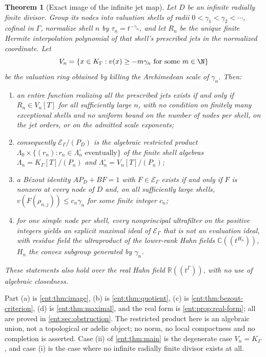 \documentclass[11pt]{article}
\newtheorem{theorem}{Theorem}[section]
\theoremstyle{plain}
\theoremstyle{plain}
\theoremstyle{plain}
\theoremstyle{definition}
\theoremstyle{definition}
\theoremstyle{definition}
\theoremstyle{definition}
\theoremstyle{remark}
\newcommand{\C}{\mathbb C}\newcommand{\R}{\mathbb R}
\newcommand{\K}{K_\Gamma}\newcommand{\KD}{K_\Delta}
\newcommand{\E}{\mathcal E_\Gamma}
\begin{document}
\begin{theorem}[Exact image of the infinite jet map]\label{ent:thm:main-image}
Let $D$ be an infinite radially finite divisor. Group its nodes into
valuation shells of radii $0<\gamma_1<\gamma_2<\cdots$, cofinal in $\Gamma$,
normalize shell $n$ by $\tau_n=t^{-\gamma_n}$, and let $R_n$ be the unique
finite Hermite interpolation polynomial of that shell's prescribed jets in
the normalized coordinate. Let
\[
 V_n=\{x\in\K:v(x)\ge-m\gamma_n\text{ for some }m\in\N\}
\]
be the valuation ring obtained by killing the Archimedean scale of
$\gamma_n$. Then:
\begin{enumerate}[label=\textnormal{(\alph*)},leftmargin=2em]
\item an entire function realizing all the prescribed jets exists if and only
if $R_n\in V_n[T]$ for all sufficiently large $n$, with no condition on
finitely many exceptional shells and no uniform bound on the number of nodes
per shell, on the jet orders, or on the admitted scale exponents;
\item consequently $\E/(P_D)$ is the algebraic restricted product
$\Lambda_0\times\{(r_n):r_n\in\Lambda_n^\circ\text{ eventually}\}$ of the
finite shell algebras $\Lambda_n=\K[T]/(P_n)$ and
$\Lambda_n^\circ=V_n[T]/(P_n)$;
\item a B\'ezout identity $AP_D+BF=1$ with $F\in\E$ exists if and only if $F$
is nonzero at every node of $D$ \emph{and}, on all sufficiently large shells,
$v(F(\rho_{n,j}))\le c_n\gamma_n$ for some finite integer $c_n$;
\item for one simple node per shell, every nonprincipal ultrafilter on the
positive integers yields an explicit maximal ideal of $\E$ that is not an
evaluation ideal, with residue field the ultraproduct of the lower-rank Hahn
fields $\C((t^{H_n}))$, $H_n$ the convex subgroup generated by $\gamma_n$.
\end{enumerate}
These statements also hold over the real Hahn field $\R((t^\Gamma))$, with no
use of algebraic closedness.
\end{theorem}

Part (a) is \cref{ent:thm:image}, (b) is \cref{ent:thm:quotient}, (c) is
\cref{ent:thm:bezout-criterion}, (d) is \cref{ent:thm:maximal}, and the real
form is \cref{ent:prop:real-form}; all are proved in
\cref{ent:sec:obstruction}. The restricted product here is an algebraic
union, not a topological or adelic object; no norm, no local compactness and
no completion is asserted. Case (ii) of \cref{ent:thm:main} is the
degenerate case $V_n=\K$, and case (i) is the case where no infinite radially
finite divisor exists at all.
\end{document}
